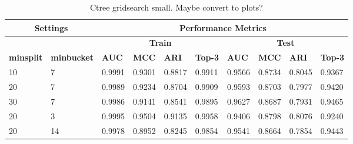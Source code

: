 \begin{table}[htp]
    \centering
    \begin{tabular}{|p{2cm}|p{2cm}||p{1cm}|p{1cm}|p{1cm}|p{1.2cm}||p{1cm}|p{1cm}|p{1cm}|p{1.2cm}|}
        \hline
        \multicolumn{2}{|c||}{\textbf{Settings}} & \multicolumn{8}{|c|}{\textbf{Performance Metrics}}  \\
        \hline
        \multicolumn{2}{|c||}{} & \multicolumn{4}{|c||}{\textbf{Train}} & \multicolumn{4}{|c|}{\textbf{Test}} \\
        \hline
        \hline
        \textbf{minsplit} & \textbf{minbucket} & \textbf{AUC} & \textbf{MCC} & \textbf{ARI} & \textbf{Top-3} & \textbf{AUC} & \textbf{MCC} & \textbf{ARI} & \textbf{Top-3} \\
        \hline
        10 & 7 & 0.9991 & 0.9301 & 0.8817 & 0.9911 & 0.9566 & 0.8734 & 0.8045 & 0.9367 \\
        \hline
        20 & 7 & 0.9989 & 0.9234 & 0.8704 & 0.9909 & 0.9593 & 0.8703 & 0.7977 & 0.9420 \\
        \hline
        30 & 7 & 0.9986 & 0.9141 & 0.8541 & 0.9895 & 0.9627 & 0.8687 & 0.7931 & 0.9465 \\
        \hline
        20 & 3 & 0.9995 & 0.9504 & 0.9135 & 0.9958 & 0.9406 & 0.8798 & 0.8076 & 0.9240 \\
        \hline
        20 & 14 & 0.9978 & 0.8952 & 0.8245 & 0.9854 & 0.9541 & 0.8664 & 0.7854 & 0.9443 \\
        \hline
    \end{tabular}
    \caption{Ctree gridsearch small. Maybe convert to plots?}
    \label{tab:ctree_gs}
\end{table}
